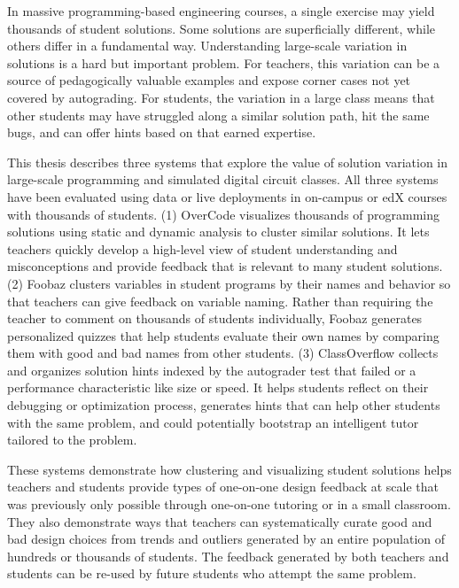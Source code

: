 %
%
%

In massive programming-based engineering courses, a single exercise may yield thousands of student solutions. Some solutions are superficially different, while others differ in a fundamental way. Understanding large-scale variation in solutions is a hard but important problem. For teachers, this variation can be a source of pedagogically valuable examples and expose corner cases not yet covered by autograding. For students, the variation in a large class means that other students may have struggled along a similar solution path, hit the same bugs, and can offer hints based on that earned expertise.

This thesis describes three systems that explore the value of solution variation in large-scale programming and simulated digital circuit classes. All three systems have been evaluated using data or live deployments in on-campus or edX courses with thousands of students. (1) OverCode visualizes thousands of programming solutions using static and dynamic analysis to cluster similar solutions. It lets teachers quickly develop a high-level view of student understanding and misconceptions and provide feedback that is relevant to many student solutions. (2) Foobaz clusters variables in student programs by their names and behavior so that teachers can give feedback on variable naming. Rather than requiring the teacher to comment on thousands of students individually, Foobaz generates personalized quizzes that help students evaluate their own names by comparing them with good and bad names from other students. (3) ClassOverflow collects and organizes solution hints indexed by the autograder test that failed or a performance characteristic like size or speed. It helps students reflect on their debugging or optimization process, generates hints that can help other students with the same problem, and could potentially bootstrap an intelligent tutor tailored to the problem.

These systems demonstrate how clustering and visualizing student solutions helps teachers and students provide types of one-on-one design feedback at scale that was previously only possible through one-on-one tutoring or in a small classroom. They also demonstrate ways that teachers can systematically curate good and bad design choices from trends and outliers generated by an entire population of hundreds or thousands of students. The feedback generated by both teachers and students can be re-used by future students who attempt the same problem.

